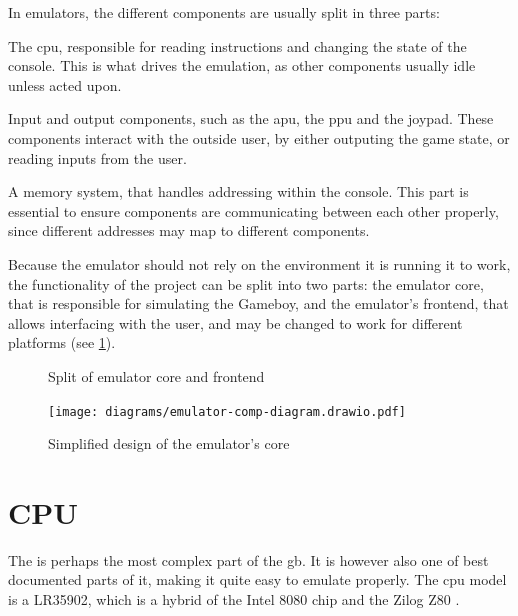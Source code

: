 \documentclass[11pt]{report}
\begin{document}
In emulators, the different components are usually split in three parts:
\begin{compactitem}
	\item The \gls{cpu}, responsible for reading instructions and changing the state of the console. This is what drives the emulation, as other components usually idle unless acted upon.
	\item Input and output components, such as the \gls{apu}, the \gls{ppu} and the joypad. These components interact with the outside user, by either outputing the game state, or reading inputs from the user.
	\item A memory system, that handles addressing within the console. This part is essential to ensure components are communicating between each other properly, since different addresses may map to different components.
\end{compactitem}

Because the emulator should not rely on the environment it is running it to work, the functionality of the project can be split into two parts: the emulator core, that is responsible for simulating the Gameboy, and the emulator's frontend, that allows interfacing with the user, and may be changed to work for different platforms (see \ref{fig:emu-back-front-split-uml}).

\begin{figure}[h]
    \centering
    \caption{Split of emulator core and frontend}
    \label{fig:emu-back-front-split-uml}
\end{figure}

\begin{figure}[h]
    \centering
    \texttt{[image: diagrams/emulator-comp-diagram.drawio.pdf]}
    \caption{Simplified design of the emulator's core}
    \label{fig:emu-core-components}
\end{figure}

\section{CPU}

The  is perhaps the most complex part of the \gls{gb}. It is however also one of best documented parts of it, making it quite easy to emulate properly. The \gls{cpu} model is a LR35902, which is a hybrid of the Intel 8080 chip and the Zilog Z80 \cite{gbcpumanual}.
\end{document}
